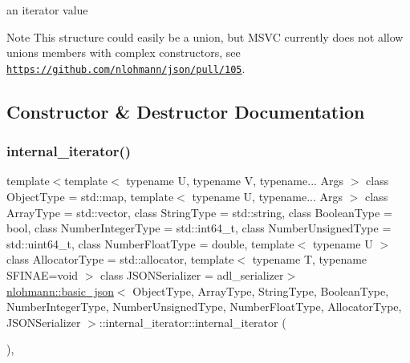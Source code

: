 an iterator value 

\begin{DoxyNote}{Note}
This structure could easily be a union, but M\+S\+VC currently does not allow unions members with complex constructors, see \href{https://github.com/nlohmann/json/pull/105}{\tt https\+://github.\+com/nlohmann/json/pull/105}. 
\end{DoxyNote}


\subsection{Constructor \& Destructor Documentation}
\mbox{\label{structnlohmann_1_1basic__json_1_1internal__iterator_a95db88d1f886d5b86d34c507af5b3170}} 
\subsubsection{\texorpdfstring{internal\+\_\+iterator()}{internal\_iterator()}}
{\footnotesize\ttfamily template$<$template$<$ typename U, typename V, typename... Args $>$ class Object\+Type = std\+::map, template$<$ typename U, typename... Args $>$ class Array\+Type = std\+::vector, class String\+Type  = std\+::string, class Boolean\+Type  = bool, class Number\+Integer\+Type  = std\+::int64\+\_\+t, class Number\+Unsigned\+Type  = std\+::uint64\+\_\+t, class Number\+Float\+Type  = double, template$<$ typename U $>$ class Allocator\+Type = std\+::allocator, template$<$ typename T, typename S\+F\+I\+N\+A\+E=void $>$ class J\+S\+O\+N\+Serializer = adl\+\_\+serializer$>$ \\
\hyperlink{classnlohmann_1_1basic__json}{nlohmann\+::basic\+\_\+json}$<$ Object\+Type, Array\+Type, String\+Type, Boolean\+Type, Number\+Integer\+Type, Number\+Unsigned\+Type, Number\+Float\+Type, Allocator\+Type, J\+S\+O\+N\+Serializer $>$\+::internal\+\_\+iterator\+::internal\+\_\+iterator (\begin{DoxyParamCaption}{ }\end{DoxyParamCaption})\hspace{0.3cm}{\ttfamily [inline]}, {\ttfamily [noexcept]}}



